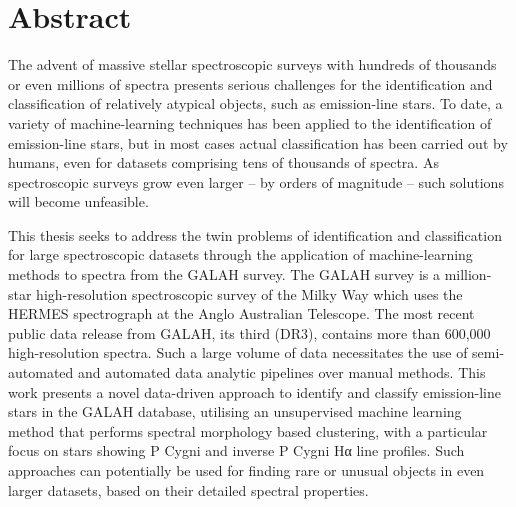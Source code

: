 \chapter{Abstract}

The advent of massive stellar spectroscopic surveys with hundreds of thousands or even millions of spectra presents serious challenges for the identification and classification of relatively atypical objects, such as emission-line stars. To date, a variety of machine-learning techniques has been applied to the identification of emission-line stars, but in most cases actual classification has been carried out by humans, even for datasets comprising tens of thousands of spectra. As spectroscopic surveys grow even larger – by orders of magnitude – such solutions will become unfeasible.

This thesis seeks to address the twin problems of identification and classification for large spectroscopic datasets through the application of machine-learning methods to spectra from the GALAH survey. The GALAH survey is a million-star high-resolution spectroscopic survey of the Milky Way which uses the HERMES spectrograph at the Anglo Australian Telescope. The most recent public data release from GALAH, its third (DR3), contains more than 600,000 high-resolution spectra. Such a large volume of data necessitates the use of semi-automated and automated data analytic pipelines over manual methods. This work presents a novel data-driven approach to identify and classify emission-line stars in the GALAH database, utilising an unsupervised machine learning method that performs spectral morphology based clustering, with a particular focus on stars showing P Cygni and inverse P Cygni Hα line profiles. Such approaches can potentially be used for finding rare or unusual objects in even larger datasets, based on their detailed spectral properties.

